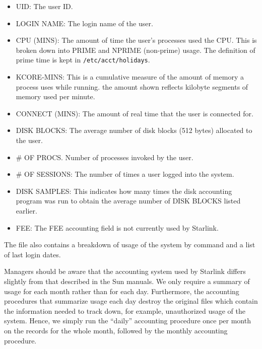 \begin{itemize}

\item UID: The user ID.

\item LOGIN NAME: The login name of the user.

\item CPU (MINS): The amount of time the user's processes used the CPU. This
is broken down into PRIME and NPRIME (non-prime) usage. The definition of
prime time is kept in {\tt /etc/acct/holidays}.

\item KCORE-MINS: This is a cumulative measure of the amount of memory a process
uses while running. the amount shown reflects kilobyte segments of memory used
per minute.

\item CONNECT (MINS): The amount of real time that the user is connected for.

\item DISK BLOCKS: The average number of disk blocks (512 bytes) allocated to
the user.

\item \# OF PROCS. Number of processes invoked by the user.

\item \# OF SESSIONS: The number of times a user logged into the system.

\item DISK SAMPLES: This indicates how many times the disk accounting program
was run to obtain the average number of DISK BLOCKS listed earlier.

\item FEE: The FEE accounting field is not currently used by Starlink.

\end{itemize}

The file also contains a breakdown of usage of the system by command and a
list of last login dates.

Managers should be aware that the accounting system used by Starlink differs
slightly from that described in the Sun manuals. We only require a summary
of usage for each month rather than for each day. Furthermore, the accounting
procedures that summarize usage each day destroy the original files which contain the
information needed to track down, for example, unauthorized usage of the
system. Hence, we simply run the ``daily'' accounting procedure once per
month on the records for the whole month, followed by the monthly accounting
procedure.

